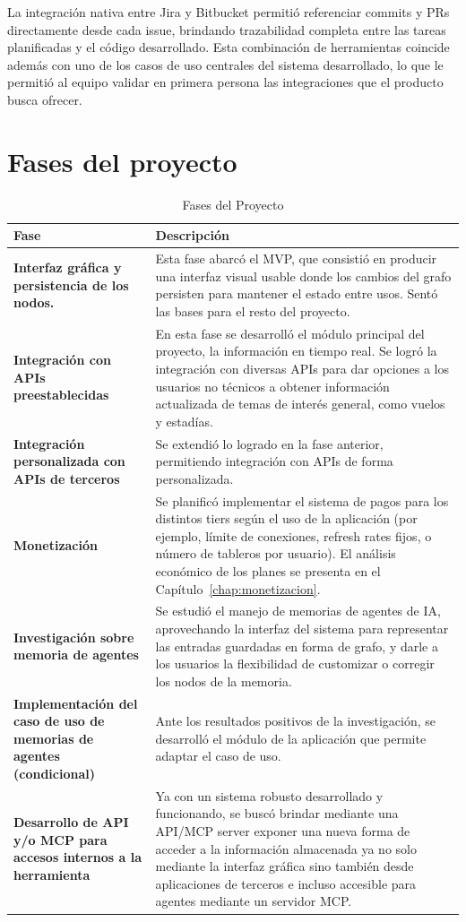 La integración nativa entre Jira y Bitbucket permitió referenciar commits y PRs directamente desde cada issue, brindando trazabilidad completa entre las tareas planificadas y el código desarrollado. Esta combinación de herramientas coincide además con uno de los casos de uso centrales del sistema desarrollado, lo que le permitió al equipo validar en primera persona las integraciones que el producto busca ofrecer.

\section{Fases del proyecto}
\begin{table}[H]
  \centering
  \renewcommand{\arraystretch}{1.25}
  \begin{tabularx}{\textwidth}{>{\bfseries}p{} X}
    \toprule
    Fase & Descripción \\
    \midrule
    Interfaz gráfica y persistencia de los nodos. & Esta fase abarcó el MVP, que consistió en producir una interfaz visual usable donde los cambios del grafo persisten para mantener el estado entre usos. Sentó las bases para el resto del proyecto. \\
    Integración con APIs preestablecidas & En esta fase se desarrolló el módulo principal del proyecto, la información en tiempo real. Se logró la integración con diversas APIs para dar opciones a los usuarios no técnicos a obtener información actualizada de temas de interés general, como vuelos y estadías. \\
    Integración personalizada con APIs de terceros & Se extendió lo logrado en la fase anterior, permitiendo integración con APIs de forma personalizada. \\
    Monetización & Se planificó implementar el sistema de pagos para los distintos tiers según el uso de la aplicación (por ejemplo, límite de conexiones, refresh rates fijos, o número de tableros por usuario). El análisis económico de los planes se presenta en el Capítulo~\ref{chap:monetizacion}. \\
    Investigación sobre memoria de agentes & Se estudió el manejo de memorias de agentes de IA, aprovechando la interfaz del sistema para representar las entradas guardadas en forma de grafo, y darle a los usuarios la flexibilidad de customizar o corregir los nodos de la memoria. \\
    Implementación del caso de uso de memorias de agentes (condicional) & Ante los resultados positivos de la investigación, se desarrolló el módulo de la aplicación que permite adaptar el caso de uso. \\
    Desarrollo de API y/o MCP para accesos internos a la herramienta & Ya con un sistema robusto desarrollado y funcionando, se buscó brindar mediante una API/MCP server exponer una nueva forma de acceder a la información almacenada ya no solo mediante la interfaz gráfica sino también desde aplicaciones de terceros e incluso accesible para agentes mediante un servidor MCP. \\
    \bottomrule
  \end{tabularx}
  \caption{Fases del Proyecto}
  \label{tab:fases_proyecto}
\end{table}

